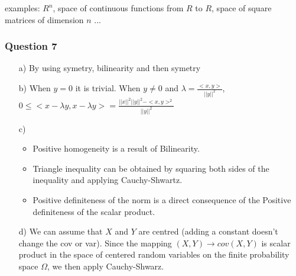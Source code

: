 \documentclass[12pt]{article}
\newcommand{\Q}[1]{\subsubsection*{Question #1}}
\begin{document}
examples: $R^n$, space of continuous functions from $R$ to $R$, space of square matrices of dimension $n$ ...
\Q{7}
\begin{itemize}
\item [a)] By using symetry, bilinearity and then symetry
\item [b)] When $y = 0$ it is trivial. When $y \neq 0$ and $\lambda = \frac{<x,y>}{||y||^2}$, $0 \leq <x - \lambda y, x - \lambda y> = \frac{||x||^2 ||y||^2 - <x, y>^2}{||y||^2} $

\item [c)]
  \begin{itemize}
  \item Positive homogeneity is a result of Bilinearity.
  \item Triangle inequality can be obtained by squaring both sides of the inequality and applying Cauchy-Shwartz.
  \item Positive definiteness of the norm is a direct consequence of the Positive definiteness of the scalar product.
  \end{itemize}
  
  \item [d)] We can assume that $X$ and $Y$ are centred (adding a constant doesn't change the cov or var). Since the mapping $(X, Y) \longrightarrow cov(X, Y)$ is scalar product in the space of centered random variables on the finite probability space $\Omega$, we then apply Cauchy-Shwarz.
  \end{itemize}
\end{document}

